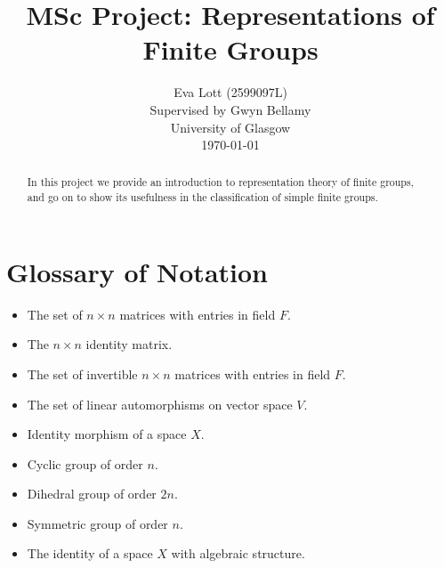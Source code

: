 


\makeatletter
{}
\makeatother

\title{\vspace{-1.9cm}\textbf{MSc Project: Representations of Finite Groups}}
\author{Eva Lott (2599097L)\\Supervised by Gwyn Bellamy\\
	{University of Glasgow}\\ \today}
\date{}



\clearpage
\maketitle
\begin{abstract}
	In this project we provide an introduction to representation theory of finite groups, and go on to show its usefulness in the classification of simple finite groups.
\end{abstract}
\thispagestyle{empty}
\tableofcontents

\newpage
\section{Glossary of Notation}
\setcounter{page}{1}
	\begin{itemize}
		\item{ The set of $n\times n$ matrices with entries in field $F$.}
		\item{ The $n\times n$ identity matrix.}
		\item { The set of invertible $n\times n$ matrices with entries in field $F$.}
		\item { The set of linear automorphisms on vector space $V$.}
		\item { Identity morphism of a space $X$.}
		\item { Cyclic group of order $n$.}
		\item { Dihedral group of order $2n$.}
		\item { Symmetric group of order $n$.}
		\item { The identity of a space $X$ with algebraic structure.}
	\end{itemize}

